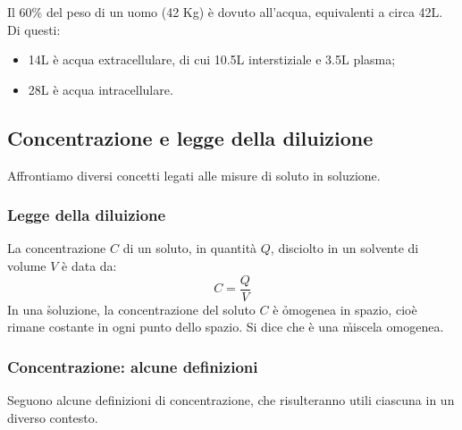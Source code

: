 Il 60\% del peso di un uomo (42 Kg) è dovuto all'acqua, equivalenti a circa 42L. Di questi:
\begin{itemize}
    \item 14L è acqua extracellulare, di cui 10.5L interstiziale e 3.5L plasma;
    \item 28L è acqua intracellulare.
\end{itemize}

\subsection{Concentrazione e legge della diluizione}
Affrontiamo diversi concetti legati alle misure di soluto in soluzione.

\subsubsection{Legge della diluizione}
La concentrazione $C$ di un soluto, in quantità $Q$, disciolto in un solvente di volume $V$ è data da:
\begin{equation*}
    C = \frac{Q}{V}
\end{equation*}
In una \h{soluzione}, la concentrazione del soluto $C$ è \h{omogenea in spazio}, cioè rimane costante in ogni punto dello spazio. Si dice che è una \h{miscela omogenea}.


\subsubsection{Concentrazione: alcune definizioni}
Seguono alcune definizioni di concentrazione, che risulteranno utili ciascuna in un diverso contesto.


